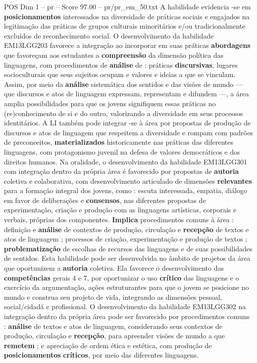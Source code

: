 \begin{textsample}{POS Dim 1 – pr – Score 97.00 – pr/pr\_em\_50.txt}
A habilidade evidencia -se em \textbf{posicionamentos} interessados na diversidade de práticas sociais e engajados na legitimação das práticas de grupos culturais minoritários e/ou tradicionalmente excluídos de reconhecimento social.
O desenvolvimento da habilidade EM13LGG203 favorece a integração ao incorporar em suas práticas \textbf{abordagens} que favoreçam aos estudantes a \textbf{compreensão} da dimensão política das linguagens, com procedimentos de \textbf{análise} de : práticas \textbf{discursivas}, lugares socioculturais que seus sujeitos ocupam e valores e ideias a que se vinculam.
Assim, por meio da \textbf{análise} sistemática dos sentidos e das visões de mundo — que discursos e atos de linguagem expressam, representam e difundem —, a área amplia possibilidades para que os jovens signifiquem essas práticas no (re)conhecimento de si e do outro, valorizando a diversidade em seus processos identitários.
A LI também pode integrar -se à área por propostas de produção de discursos e atos de linguagem que respeitem a diversidade e rompam com padrões de preconceitos, \textbf{materializados} historicamente nas práticas das diferentes linguagens, com protagonismo juvenil na defesa de valores democráticos e dos direitos humanos.
Na oralidade, o desenvolvimento da habilidade EM13LGG301 com integração dentro da própria área é favorecido por propostas de \textbf{autoria} coletiva e colaborativa, com desenvolvimento articulado de dimensões \textbf{relevantes} para a formação integral dos jovens, como : escuta interessada, empatia, diálogo em favor de deliberações e \textbf{consensos}, nas diferentes propostas de experimentação, criação e produção com as linguagens artísticas, corporais e verbais, próprias dos componentes. \textbf{Implica} procedimentos comuns à área : definição e \textbf{análise} de contextos de produção, circulação e \textbf{recepção} de textos e atos de linguagem ; processos de criação, experimentação e produção de textos ; \textbf{problematização} de escolhas de recursos das linguagens e de suas possibilidades de sentidos.
Esta habilidade pode ser desenvolvida no âmbito de projetos da área que oportunizem a \textbf{autoria} coletiva.
Ela favorece o desenvolvimento das \textbf{competências} gerais 4 e 7, por oportunizar o uso \textbf{crítico} das linguagens e o exercício da argumentação, ações estruturantes para que o jovem se posicione no mundo e construa seu projeto de vida, integrando as dimensões pessoal, social/cidadã e profissional.
O desenvolvimento da habilidade EM13LGG302 na integração dentro da própria área pode ser favorecido por procedimentos comuns : \textbf{análise} de textos e atos de linguagem, considerando seus contextos de produção, circulação e \textbf{recepção}, para apreender visões de mundo a que \textbf{remetem} ; e apreciação de ordem ética e estética, com produção de \textbf{posicionamentos} \textbf{críticos}, por meio das diferentes linguagens.

\end{textsample}
